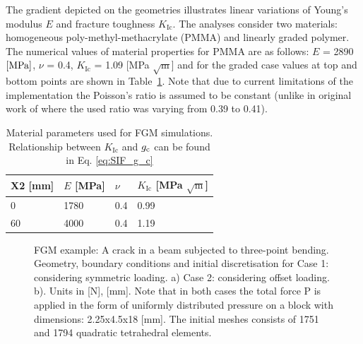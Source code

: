\documentclass[onecolumn]{svjour3}
\begin{document}
The gradient depicted on the geometries illustrates linear variations of Young's modulus $E$ and fracture toughness $K_\mathrm{Ic}$. The analyses consider two materials: homogeneous poly-methyl-methacrylate (PMMA) and linearly graded polymer. The numerical values of material properties for PMMA are as follows: $E$ = 2890~${\rm {[MPa]}}$, $\nu$ = 0.4,  $K_\mathrm{Ic}$ = 1.09 [MPa $\sqrt{\mathrm m}$] and for the graded case values at top and bottom points are shown in Table~\ref{tab:parameters_fgm}. Note that due to current limitations of the implementation the Poisson's ratio is assumed to be constant (unlike in original work of \cite{kim2004simulation} where the used ratio was varying from 0.39 to 0.41). 
% 
\begin{table}[h]
	\centering
	\begin{tabular}{llll}
		\hline
		X2 [mm]            \hspace{1.0cm} 	&  $E$ [MPa] \hspace{1.0cm} & $\nu$    \hspace{1.0cm}     & $K_\mathrm{Ic}$ [MPa $\sqrt{\mathrm m}$]  \\ \hline
		$0  $              \hspace{1.0cm}   &  1780  	 \hspace{1.0cm}	& 0.4      \hspace{1.0cm}  		&  0.99\\
		$60  $            \hspace{1.0cm}   &  4000  	 \hspace{1.0cm}	& 0.4      \hspace{1.0cm}     &  1.19 \\
		\hline
	\end{tabular} 
	\caption{Material parameters used for FGM simulations. Relationship between $K_\mathrm{Ic}$ and $g_{\rm c}$ can be found in Eq. \ref{eq:SIF_g_c}}
	\label{tab:parameters_fgm}
\end{table}
% 
% 
% 
\begin{figure}[h!]
	\centering
	\begin{center}
	\def\svgwidth{12cm} 
	\caption{FGM example: A crack in a beam subjected to three-point bending. Geometry, boundary conditions and initial discretisation for Case 1: considering symmetric loading. a) Case 2: considering offset loading. b). Units in [N], [mm]. Note that in both cases the total force P is applied in the form of uniformly distributed pressure on a block with dimensions: 2.25x4.5x18 [mm]. The initial meshes consists of 1751 and 1794 quadratic tetrahedral elements.}
	\label{fig:fgm_mesh_load}
	\end{center}
\end{figure}
% 
\end{document}
